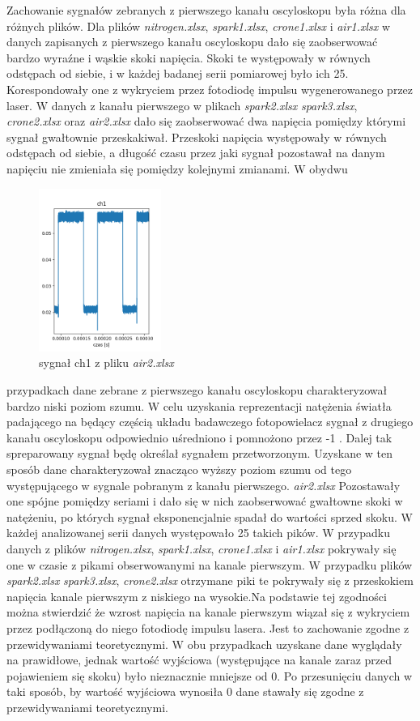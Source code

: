 \documentclass[10pt,a4paper]{article}
\begin{document}
Zachowanie sygnałów zebranych z pierwszego kanału oscyloskopu była różna dla różnych plików. Dla plików \textit{nitrogen.xlsx}, \textit{spark1.xlsx}, \textit{crone1.xlsx} i \textit{air1.xlsx} w danych zapisanych z pierwszego kanału oscyloskopu dało się zaobserwować bardzo wyraźne i wąskie skoki napięcia. Skoki te występowały w równych odstępach od siebie, i w każdej badanej serii pomiarowej było ich 25. Korespondowały one z wykryciem przez fotodiodę impulsu wygenerowanego przez laser.
W danych z kanału pierwszego w plikach \textit{spark2.xlsx} \textit{spark3.xlsx}, \textit{crone2.xlsx} oraz \textit{air2.xlsx} dało się zaobserwować dwa napięcia pomiędzy którymi sygnał gwałtownie przeskakiwał. Przeskoki napięcia występowały w równych odstępach od siebie, a długość czasu przez jaki sygnał pozostawał na danym napięciu nie zmieniała się pomiędzy kolejnymi zmianami. W obydwu
\newpage 
\begin{figure}
    \centering
    \includegraphics[width=4cm]{pictures/ch1_2.png}
    \caption{sygnał ch1 z pliku  \textit{air2.xlsx}}
    \label{ch1_2}
\end{figure}
przypadkach dane zebrane z pierwszego kanału oscyloskopu charakteryzował bardzo niski poziom szumu. W celu uzyskania reprezentacji natężenia światła padającego na będący częścią układu badawczego fotopowielacz sygnał z drugiego kanału oscyloskopu odpowiednio uśredniono i pomnożono przez -1 \cite{strona}. Dalej tak spreparowany sygnał będę określał sygnałem przetworzonym. Uzyskane w ten sposób dane charakteryzował znacząco wyższy poziom szumu od tego występującego w sygnale pobranym z kanału pierwszego. \textit{air2.xlsx} Pozostawały one spójne pomiędzy seriami i dało się w nich zaobserwować gwałtowne skoki w natężeniu, po których sygnał eksponencjalnie spadał do wartości sprzed skoku. W  każdej analizowanej serii danych występowało 25 takich pików.  W przypadku danych z plików \textit{nitrogen.xlsx}, \textit{spark1.xlsx}, \textit{crone1.xlsx} i \textit{air1.xlsx} pokrywały się one w czasie z pikami obserwowanymi na kanale pierwszym. W przypadku plików \textit{spark2.xlsx} \textit{spark3.xlsx}, \textit{crone2.xlsx} otrzymane piki te pokrywały się z przeskokiem napięcia kanale pierwszym z niskiego na wysokie.Na podstawie tej zgodności można stwierdzić że wzrost napięcia na kanale pierwszym wiązał się z wykryciem przez podłączoną do niego fotodiodę impulsu lasera. Jest to zachowanie zgodne z przewidywaniami teoretycznymi. W obu przypadkach uzyskane dane wyglądały na prawidłowe, jednak wartość wyjściowa (występujące na kanale zaraz przed pojawieniem się skoku) było nieznacznie mniejsze od 0. Po przesunięciu danych w taki sposób, by wartość wyjściowa wynosiła  0 dane stawały się zgodne z przewidywaniami teoretycznymi.
\end{document}
